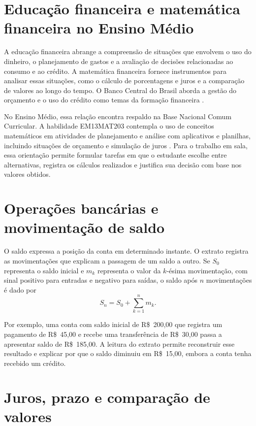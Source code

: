\section{Educação financeira e matemática financeira no Ensino Médio}
\label{sec-fundamentacao-educacao-financeira}

A educação financeira abrange a compreensão de situações que envolvem o uso do dinheiro, o planejamento de gastos e a avaliação de decisões relacionadas ao consumo e ao crédito. A matemática financeira fornece instrumentos para analisar essas situações, como o cálculo de porcentagens e juros e a comparação de valores ao longo do tempo. O Banco Central do Brasil aborda a gestão do orçamento e o uso do crédito como temas da formação financeira \cite{bcb2026caderno}.


No Ensino Médio, essa relação encontra respaldo na Base Nacional
Comum Curricular. A habilidade EM13MAT203 contempla o uso de
conceitos matemáticos em atividades de planejamento e análise
com aplicativos e planilhas, incluindo situações de orçamento
e simulação de juros \cite{brasilBNCC2018}. Para o trabalho em
sala, essa orientação permite formular tarefas em que o estudante
escolhe entre alternativas, registra os cálculos realizados e
justifica sua decisão com base nos valores obtidos.


\section{Operações bancárias e movimentação de saldo}
\label{sec-fundamentacao-operacoes}

O saldo expressa a posição da conta em determinado instante.
O extrato registra as movimentações que explicam a passagem de
um saldo a outro. Se \(S_0\) representa o saldo inicial e \(m_k\)
representa o valor da \(k\)-ésima movimentação, com sinal positivo
para entradas e negativo para saídas, o saldo após \(n\)
movimentações é dado por
\[
    S_n = S_0 + \sum_{k=1}^{n} m_k.
\]

Por exemplo, uma conta com saldo inicial de \mbox{R\$~200,00}
que registra um pagamento de \mbox{R\$~45,00} e recebe uma
transferência de \mbox{R\$~30,00} passa a apresentar saldo de
\mbox{R\$~185,00}. A leitura do extrato permite reconstruir esse
resultado e explicar por que o saldo diminuiu em
\mbox{R\$~15,00}, embora a conta tenha recebido um crédito.

\section{Juros, prazo e comparação de valores}
\label{sec-fundamentacao-juros}



